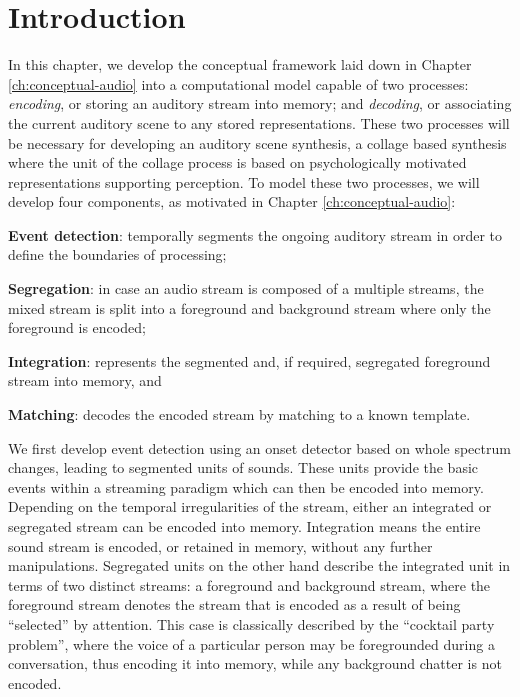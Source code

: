 \documentclass[a4paper,10pt,final]{ThesisStyle}
\begin{document}
\section{Introduction}

In this chapter, we develop the conceptual framework laid down in Chapter \ref{ch:conceptual-audio} into a computational model capable of two processes: \textit{encoding}, or storing an auditory stream into memory; and \textit{decoding}, or associating the current auditory scene to any stored representations.  These two processes will be necessary for developing an auditory scene synthesis, a collage based synthesis where the unit of the collage process is based on psychologically motivated representations supporting perception.  To model these two processes, we will develop four components, as motivated in Chapter \ref{ch:conceptual-audio}: 

\begin{enumerateb}
\item \textbf{Event detection}: temporally segments the ongoing auditory stream in order to define the boundaries of processing; 
\item \textbf{Segregation}: in case an audio stream is composed of a multiple streams, the mixed stream is split into a foreground and background stream where only the foreground is encoded; 
\item \textbf{Integration}: represents the segmented and, if required, segregated foreground stream into memory, and 
\item \textbf{Matching}: decodes the encoded stream by matching to a known template.
\end{enumerateb}

We first develop event detection using an onset detector based on whole spectrum changes, leading to segmented units of sounds.  These units provide the basic events within a streaming paradigm which can then be encoded into memory.  Depending on the temporal irregularities of the stream, either an integrated or segregated stream can be encoded into memory.  Integration means the entire sound stream is encoded, or retained in memory, without any further manipulations.  Segregated units on the other hand describe the integrated unit in terms of two distinct streams: a foreground and background stream, where the foreground stream denotes the stream that is encoded as a result of being ``selected'' by attention.  This case is classically described by the ``cocktail party problem'', where the voice of a particular person may be foregrounded during a conversation, thus encoding it into memory, while any background chatter is not encoded.
\end{document}
